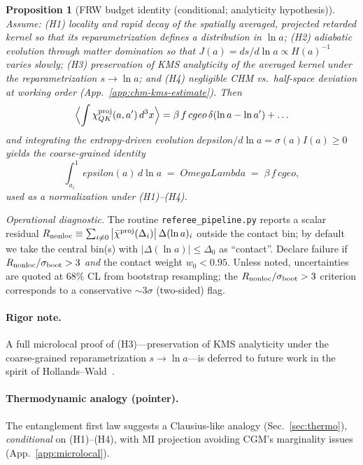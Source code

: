 \documentclass[aps,prd,onecolumn,superscriptaddress,nofootinbib]{revtex4-2}
\def\OmL{OmegaLambda}%
\def\cgeo{cgeo}%
\def\eps{epsilon}%
\def\Omega_\Lambda{OmegaLambda}%
\providecommand{\OmL}{\Omega_\Lambda}
\providecommand{\cgeo}{c_{\rm geo}}
\providecommand{\eps}{\varepsilon}
\providecommand{\be}{\begin{equation}}
\providecommand{\ee}{\end{equation}}
\newtheorem{proposition}{Proposition}
\begin{document}
\begin{proposition}[FRW budget identity (conditional; analyticity hypothesis)]
\label{prop:frw-budget}
Assume: (H1) locality and rapid decay of the spatially averaged, projected retarded kernel so that its reparametrization defines a distribution in $\ln a$; (H2) adiabatic evolution through matter domination so that $J(a)=ds/d\ln a\propto H(a)^{-1}$ varies slowly; (H3) preservation of KMS analyticity of the averaged kernel under the reparametrization $s\!\to\!\ln a$; and (H4) negligible CHM vs.\ half-space deviation at working order (App.~\ref{app:chm-kms-estimate}). Then
\[
\Big\langle \!\int \chi^{\rm proj}_{QK}(a,a')\,d^3x \Big\rangle
= \beta\, f\, \cgeo\, \delta(\ln a-\ln a') + \ldots
\]
and integrating the entropy-driven evolution $d\eps/d\ln a=\sigma(a)I(a)\ge0$ yields the coarse-grained identity
\be
\int_{a_i}^{1}\!\eps(a)\,d\ln a \;=\; \OmL \;=\; \beta\, f\,\cgeo,
\label{eq:budget}
\ee
used as a normalization under (H1)–(H4).
\end{proposition}
\noindent\emph{Operational diagnostic.} The routine \texttt{referee\_pipeline.py} reports a scalar residual \(R_{\rm nonloc}\equiv\sum_{i\neq 0}\big|\bar\chi^{\rm proj}(\Delta_i)\big|\,\Delta(\ln a)_i\) outside the contact bin; by default we take the central bin(s) with \(|\Delta(\ln a)|\le \Delta_0\) as ``contact''. Declare failure if \(R_{\rm nonloc}/\sigma_{\rm boot}>3\) \emph{and} the contact weight \(w_0<0.95\). Unless noted, uncertainties are quoted at \(68\%\) CL from bootstrap resampling; the \(R_{\rm nonloc}/\sigma_{\rm boot}>3\) criterion corresponds to a conservative \(\sim\!3\sigma\) (two-sided) flag.

\paragraph{Rigor note.}
A full microlocal proof of (H3)—preservation of KMS analyticity under the coarse-grained reparametrization \(s\!\to\!\ln a\)—is deferred to future work in the spirit of Hollands--Wald~\cite{HollandsWald2001}.

\paragraph{Thermodynamic analogy (pointer).}
The entanglement first law suggests a Clausius-like analogy (Sec.~\ref{sec:thermo}), \emph{conditional} on (H1)–(H4), with MI projection avoiding CGM’s marginality issues (App.~\ref{app:microlocal}).

\end{document}
